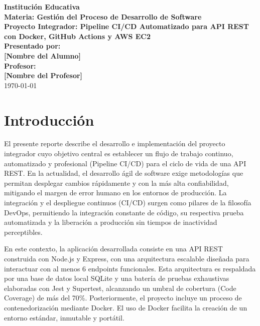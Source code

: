 \documentclass[12pt,a4paper]{article}
\begin{document}
\begin{titlepage}
    \centering
    \vspace*{2cm}
    
    {\Huge \textbf{Institución Educativa}}\\[1cm]
    {\LARGE \textbf{Materia: Gestión del Proceso de Desarrollo de Software}}\\[1.5cm]
    
    {\Large \textbf{Proyecto Integrador: Pipeline CI/CD Automatizado para API REST con Docker, GitHub Actions y AWS EC2}}\\[2cm]
    
    {\large \textbf{Presentado por:}}\\[0.5cm]
    {\large \textbf{[Nombre del Alumno]}}\\[2cm]
    
    {\large \textbf{Profesor:}}\\[0.5cm]
    {\large \textbf{[Nombre del Profesor]}}\\[3cm]
    
    \vfill
    {\large \today}
\end{titlepage}

\newpage

\section*{Introducción}
El presente reporte describe el desarrollo e implementación del proyecto integrador cuyo objetivo central es establecer un flujo de trabajo continuo, automatizado y profesional (Pipeline CI/CD) para el ciclo de vida de una API REST. En la actualidad, el desarrollo ágil de software exige metodologías que permitan desplegar cambios rápidamente y con la más alta confiabilidad, mitigando el margen de error humano en los entornos de producción. La integración y el despliegue continuos (CI/CD) surgen como pilares de la filosofía DevOps, permitiendo la integración constante de código, su respectiva prueba automatizada y la liberación a producción sin tiempos de inactividad perceptibles.

En este contexto, la aplicación desarrollada consiste en una API REST construida con Node.js y Express, con una arquitectura escalable diseñada para interactuar con al menos 6 endpoints funcionales. Esta arquitectura es respaldada por una base de datos local SQLite y una batería de pruebas exhaustivas elaboradas con Jest y Supertest, alcanzando un umbral de cobertura (Code Coverage) de más del 70\%. Posteriormente, el proyecto incluye un proceso de contenedorización mediante Docker. El uso de Docker facilita la creación de un entorno estándar, inmutable y portátil. 
\end{document}
